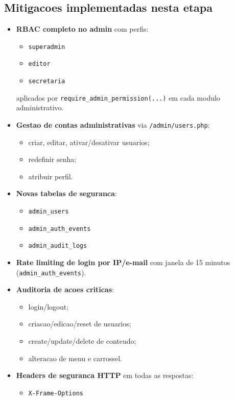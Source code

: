 \documentclass[12pt,a4paper]{article}
\begin{document}
\subsection{Mitigacoes implementadas nesta etapa}
\begin{itemize}
    \item \textbf{RBAC completo no admin} com perfis:
    \begin{itemize}
        \item \texttt{superadmin}
        \item \texttt{editor}
        \item \texttt{secretaria}
    \end{itemize}
    aplicados por \texttt{require\_admin\_permission(...)} em cada modulo administrativo.
    \item \textbf{Gestao de contas administrativas} via \texttt{/admin/users.php}:
    \begin{itemize}
        \item criar, editar, ativar/desativar usuarios;
        \item redefinir senha;
        \item atribuir perfil.
    \end{itemize}
    \item \textbf{Novas tabelas de seguranca}:
    \begin{itemize}
        \item \texttt{admin\_users}
        \item \texttt{admin\_auth\_events}
        \item \texttt{admin\_audit\_logs}
    \end{itemize}
    \item \textbf{Rate limiting de login por IP/e-mail} com janela de 15 minutos (\texttt{admin\_auth\_events}).
    \item \textbf{Auditoria de acoes criticas}:
    \begin{itemize}
        \item login/logout;
        \item criacao/edicao/reset de usuarios;
        \item create/update/delete de conteudo;
        \item alteracao de menu e carrossel.
    \end{itemize}
    \item \textbf{Headers de seguranca HTTP} em todas as respostas:
    \begin{itemize}
        \item \texttt{X-Frame-Options}

\end{itemize}
\end{itemize}
\end{document}
